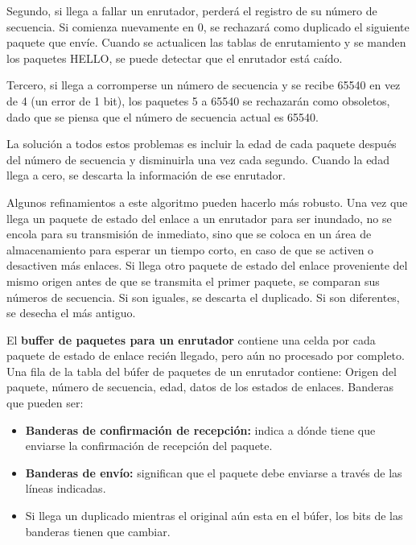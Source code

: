 \documentclass[10pt,a4paper]{report}
\begin{document}
\begin{enumerate}
		\par Segundo, si llega a fallar un enrutador, perderá el registro de su número de secuencia. Si comienza nuevamente en 0, se rechazará como duplicado el siguiente paquete que envíe. Cuando se actualicen las tablas de enrutamiento y se manden los paquetes HELLO, se puede detectar que el enrutador está caído.

		\par Tercero, si llega a corromperse un número de secuencia y se recibe 65540 en vez de 4 (un error de 1 bit), los paquetes 5 a 65540 se rechazarán como obsoletos, dado que se piensa que el número de secuencia actual es 65540.
		
		\par La solución a todos estos problemas es incluir la edad de cada paquete después del número de secuencia y disminuirla una vez cada segundo. Cuando la edad llega a cero, se descarta la información de ese enrutador.

		\par Algunos refinamientos a este algoritmo pueden hacerlo más robusto. Una vez que llega un paquete de estado del enlace a un enrutador para ser inundado, no se encola para su transmisión de inmediato, sino que se coloca en un área de almacenamiento para esperar un tiempo corto, en caso de que se activen o desactiven más enlaces. Si llega otro paquete de estado del enlace proveniente del mismo origen antes de que se transmita el primer paquete, se comparan sus números de secuencia. Si son iguales, se descarta el duplicado. Si son diferentes, se desecha el más antiguo.

		\par El \textbf{buffer de paquetes para un enrutador} contiene una celda por cada paquete de estado de enlace recién llegado, pero aún no procesado por completo. Una fila de la tabla del búfer de paquetes de un enrutador contiene: Origen del paquete, número de secuencia, edad, datos de los estados de enlaces. Banderas que pueden ser:

		\begin{itemize}
			\item \textbf{Banderas de confirmación de recepción:} indica a dónde tiene que enviarse la confirmación de recepción del paquete.
			\item \textbf{Banderas de envío:} significan que el paquete debe enviarse a través de las líneas indicadas.
			\item Si llega un duplicado mientras el original aún esta en el búfer, los bits de las banderas tienen que cambiar.
		\end{itemize}
		

\end{enumerate}
\end{document}
